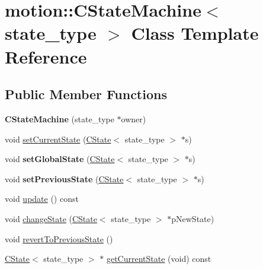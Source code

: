 \hypertarget{classmotion_1_1CStateMachine}{}\section{motion\+:\+:C\+State\+Machine$<$ state\+\_\+type $>$ Class Template Reference}
\label{classmotion_1_1CStateMachine}
\subsection*{Public Member Functions}
\begin{DoxyCompactItemize}
\item 
\mbox{\label{classmotion_1_1CStateMachine_ac91f606bd5d004771294c02a3990f7ed}} 
{\bfseries C\+State\+Machine} (state\+\_\+type $\ast$owner)
\item 
void \mbox{\hyperlink{classmotion_1_1CStateMachine_a57407660e1054b7b6e912efc3afb9495}{set\+Current\+State}} (\mbox{\hyperlink{classmotion_1_1CState}{C\+State}}$<$ state\+\_\+type $>$ $\ast$s)
\item 
\mbox{\label{classmotion_1_1CStateMachine_aaeead01662f75ed768226163665bcec4}} 
void {\bfseries set\+Global\+State} (\mbox{\hyperlink{classmotion_1_1CState}{C\+State}}$<$ state\+\_\+type $>$ $\ast$s)
\item 
\mbox{\label{classmotion_1_1CStateMachine_a55764d2e385cb61f26e6aa09f80577e4}} 
void {\bfseries set\+Previous\+State} (\mbox{\hyperlink{classmotion_1_1CState}{C\+State}}$<$ state\+\_\+type $>$ $\ast$s)
\item 
void \mbox{\hyperlink{classmotion_1_1CStateMachine_a8a944b6b5dcff9b614b434fabcd8955c}{update}} () const
\item 
void \mbox{\hyperlink{classmotion_1_1CStateMachine_a13d97b778f850709c7f9060de4aba142}{change\+State}} (\mbox{\hyperlink{classmotion_1_1CState}{C\+State}}$<$ state\+\_\+type $>$ $\ast$p\+New\+State)
\item 
void \mbox{\hyperlink{classmotion_1_1CStateMachine_ae8e1d802793aded65b1da25dad007486}{revert\+To\+Previous\+State}} ()
\item 
\mbox{\hyperlink{classmotion_1_1CState}{C\+State}}$<$ state\+\_\+type $>$ $\ast$ \mbox{\hyperlink{classmotion_1_1CStateMachine_a2231e1232b1fe6a793b95e0e2217f362}{get\+Current\+State}} (void) const

\end{DoxyCompactItemize}
